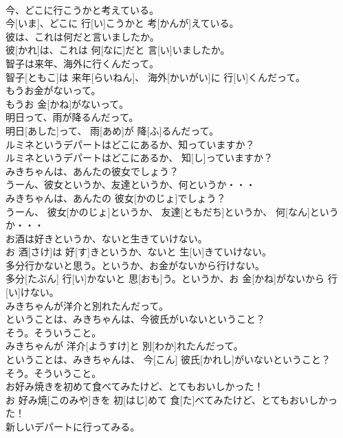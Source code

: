 \documentclass[8pt]{extreport}
\begin{document}
\begin{CJK}{UTF8}{min}
\\	今、どこに行こうかと考えている。	
\\	今[いま]、どこに 行[い]こうかと 考[かんが]えている。	
\\	彼は、これは何だと言いましたか。	
\\	彼[かれ]は、これは 何[なに]だと 言[い]いましたか。	
\\	智子は来年、海外に行くんだって。	
\\	智子[ともこ]は 来年[らいねん]、 海外[かいがい]に 行[い]くんだって。	
\\	もうお金がないって。	
\\	もうお 金[かね]がないって。	
\\	明日って、雨が降るんだって。	
\\	明日[あした]って、 雨[あめ]が 降[ふ]るんだって。	
\\	ルミネというデパートはどこにあるか、知っていますか？	
\\	ルミネというデパートはどこにあるか、 知[し]っていますか？	
\\	みきちゃんは、あんたの彼女でしょう？ 
\\	うーん、彼女というか、友達というか、何というか・・・	
\\	みきちゃんは、あんたの 彼女[かのじょ]でしょう？ 
\\	うーん、 彼女[かのじょ]というか、 友達[ともだち]というか、 何[なん]というか・・・	
\\	お酒は好きというか、ないと生きていけない。	
\\	お 酒[さけ]は 好[す]きというか、ないと 生[い]きていけない。	
\\	多分行かないと思う。というか、お金がないから行けない。	
\\	多分[たぶん] 行[い]かないと 思[おも]う。というか、お 金[かね]がないから 行[い]けない。	
\\	みきちゃんが洋介と別れたんだって。 
\\	ということは、みきちゃんは、今彼氏がいないということ？ 
\\	そう。そういうこと。	
\\	みきちゃんが 洋介[ようすけ]と 別[わか]れたんだって。 
\\	ということは、みきちゃんは、 今[こん] 彼氏[かれし]がいないということ？ 
\\	そう。そういうこと。	
\\	お好み焼きを初めて食べてみたけど、とてもおいしかった！	
\\	お 好み焼[このみや]きを 初[はじ]めて 食[た]べてみたけど、とてもおいしかった！	
\\	新しいデパートに行ってみる。	

\end{CJK}
\end{document}
